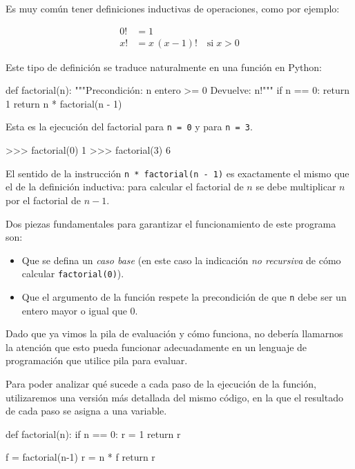 Es muy común tener definiciones inductivas de operaciones, como por ejemplo:

\begin{align*}
0! &= 1 \\
x! &= x \, (x-1)! \quad \text{si}\; x>0
\end{align*}

Este tipo de definición se traduce naturalmente en una función en Python:

\begin{codigo-python-sn}
def factorial(n):
    """Precondición: n entero >= 0
       Devuelve: n!"""
    if n == 0:
        return 1
    return n * factorial(n - 1)
\end{codigo-python-sn}

Esta es la ejecución del factorial para \lstinline!n = 0! y para
\lstinline!n = 3!.

\begin{codigo-python-sn}
>>> factorial(0)
1
>>> factorial(3)
6
\end{codigo-python-sn}

El sentido de la instrucción
\lstinline|n * factorial(n - 1)| es exactamente el mismo que el de la
definición inductiva: para calcular el factorial de $n$ se debe multiplicar
$n$ por el factorial de $n-1$.

Dos piezas fundamentales para garantizar el funcionamiento de este programa
son:

\begin{itemize}
\item Que se defina un {\it caso base} (en este caso la indicación {\it no
recursiva} de cómo calcular \lstinline|factorial(0)|).

\item Que el argumento de la función respete la precondición
de que \lstinline!n! debe ser un entero mayor o igual que 0.
\end{itemize}

Dado que ya vimos la pila de evaluación y cómo funciona, no debería
llamarnos la atención que esto pueda funcionar adecuadamente en un lenguaje
de programación que utilice pila para evaluar.

Para poder analizar qué sucede a cada paso de la ejecución de la función,
utilizaremos una versión más detallada del mismo código, en la que el resultado
de cada paso se asigna a una variable.

\begin{codigo-python-sn}
def factorial(n):
    if n == 0:
        r = 1
        return r

    f = factorial(n-1)
    r = n * f
    return r
\end{codigo-python-sn}

